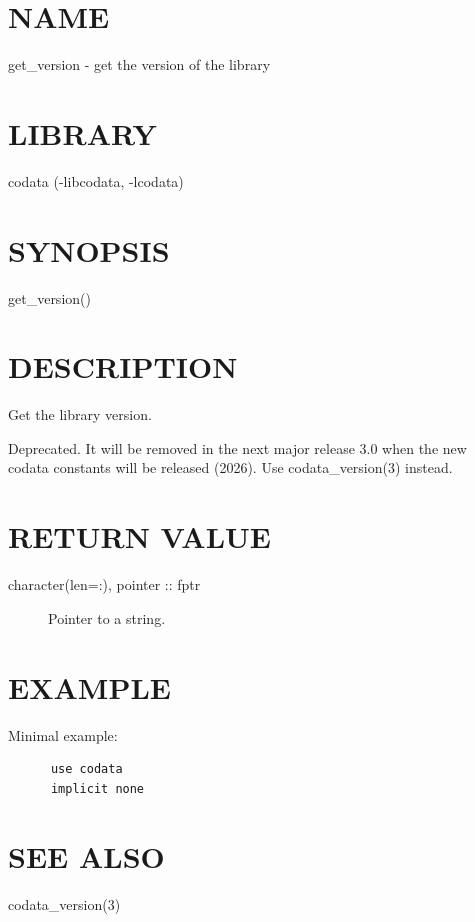 \section*{NAME}
get\_version - get the version of the library

\section*{LIBRARY}
codata (-libcodata, -lcodata)

\section*{SYNOPSIS}
{\ttfamily
get\_version()

}
\section*{DESCRIPTION}
Get the library version.

Deprecated. It will be removed in the next major release 3.0 when
the new codata constants will be released (2026).
Use codata\_version(3) instead.

\section*{RETURN VALUE}
\begin{description}
\item[character(len=:), pointer :: fptr] Pointer to a string.
\end{description}

\section*{EXAMPLE}
Minimal example:

\begin{verbatim}
      use codata
      implicit none

\end{verbatim}
\section*{SEE ALSO}
codata\_version(3)
